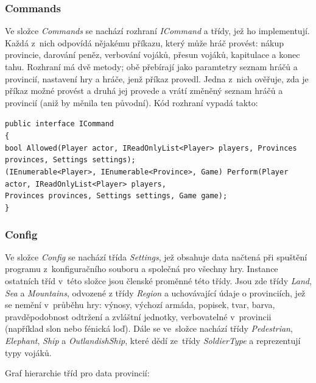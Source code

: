 \documentclass[a4paper,12pt]{article}
\def\keyword #1{\color{keyword}#1\color{black}}
\begin{document}
\subsubsection{Commands}
Ve složce \textit{Commands} se nachází rozhraní \textit{ICommand} a třídy, jež ho implementují. Každá z~nich odpovídá nějakému příkazu, který může hráč provést: nákup provincie, darování peněz, verbování vojáků, přesun vojáků, kapitulace a konec tahu. Rozhraní má dvě metody; obě přebírají jako paramtetry seznam hráčů a provincií, nastavení hry a hráče, jenž příkaz provedl. Jedna z~nich ověřuje, zda je příkaz možné provést a druhá jej provede a vrátí změněný seznam hráčů a provincií (aniž by měnila ten původní). Kód rozhraní vypadá takto:

\scriptsize\selectfont
\texttt{\keyword{public interface }ICommand}\\
\texttt{\{}\\
\hspace*{8mm}\texttt{\keyword{bool }Allowed(Player actor, IReadOnlyList<Player> players, Provinces provinces, Settings settings);}\\
\hspace*{8mm}\texttt{(IEnumerable<Player>, IEnumerable<Province>, Game) Perform(Player actor, IReadOnlyList<Player> players,}\\
\hspace*{48mm}\texttt{Provinces provinces, Settings settings, Game game);}\\
\texttt{\}}\normalsize

\subsubsection{Config}
Ve složce \textit{Config} se nachází třída \textit{Settings}, jež obsahuje data načtená při spuštění programu z~konfiguračního souboru a společná pro všechny hry. Instance ostatních tříd v~této složce jsou členské proměnné této třídy. Jsou zde třídy \textit{Land}, \textit{Sea} a \textit{Mountains}, odvozené z třídy \textit{Region} a uchovávající údaje o provinciích, jež se nemění v~průběhu hry: výnosy, výchozí armáda, popisek, tvar, barva, pravděpodobnost odtržení a zvláštní jednotky, verbovatelné v~provincii (například slon nebo fénická loď). Dále se ve~složce nachází třídy \textit{Pedestrian}, \textit{Elephant}, \textit{Ship} a \textit{OutlandishShip}, které dědí ze~třídy \textit{SoldierType} a reprezentují typy vojáků.

Graf hierarchie tříd pro data provincií:
\end{document}
